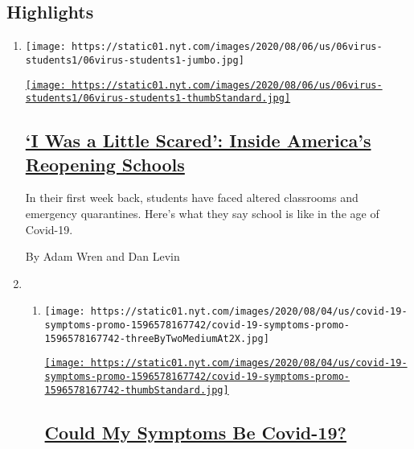 \hypertarget{highlights}{%
\subsection{Highlights}\label{highlights}}

\begin{enumerate}
\def\labelenumi{\arabic{enumi}.}
\item
  \texttt{[image: https://static01.nyt.com/images/2020/08/06/us/06virus-students1/06virus-students1-jumbo.jpg]}

  \href{/2020/08/06/us/coronavirus-students.html}{\texttt{[image: https://static01.nyt.com/images/2020/08/06/us/06virus-students1/06virus-students1-thumbStandard.jpg]}}

  \hypertarget{i-was-a-little-scared-inside-americas-reopening-schools}{%
  \subsection{\texorpdfstring{\href{/2020/08/06/us/coronavirus-students.html}{`I
  Was a Little Scared': Inside America's Reopening
  Schools}}{`I Was a Little Scared': Inside America's Reopening Schools}}\label{i-was-a-little-scared-inside-americas-reopening-schools}}

  In their first week back, students have faced altered classrooms and
  emergency quarantines. Here's what they say school is like in the age
  of Covid-19.

  By Adam Wren and Dan Levin
\item
  \begin{enumerate}
  \def\labelenumii{\arabic{enumii}.}
  \item
    \texttt{[image: https://static01.nyt.com/images/2020/08/04/us/covid-19-symptoms-promo-1596578167742/covid-19-symptoms-promo-1596578167742-threeByTwoMediumAt2X.jpg]}

    \href{/interactive/2020/08/05/well/covid-19-symptoms.html}{\texttt{[image: https://static01.nyt.com/images/2020/08/04/us/covid-19-symptoms-promo-1596578167742/covid-19-symptoms-promo-1596578167742-thumbStandard.jpg]}}

    \hypertarget{could-my-symptoms-be-covid-19}{%
    \subsection{\texorpdfstring{\href{/interactive/2020/08/05/well/covid-19-symptoms.html}{Could
    My Symptoms Be
    Covid-19?}}{Could My Symptoms Be Covid-19?}}\label{could-my-symptoms-be-covid-19}}


\end{enumerate}
\end{enumerate}
